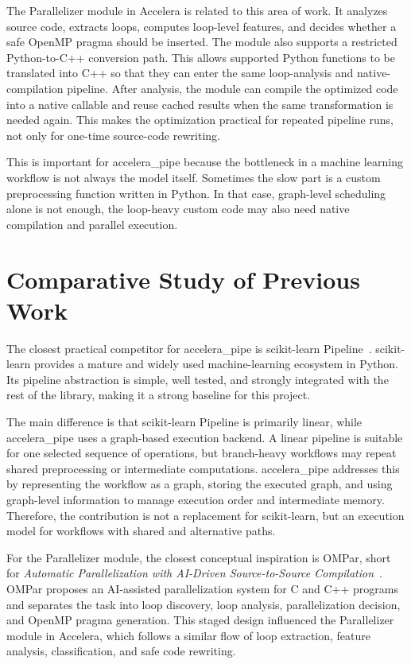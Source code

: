\documentclass[12pt,a4paper,oneside]{report}
\newcommand{\systemname}{Accelera}
\begin{document}
The Parallelizer module in Accelera is related to this area of work. It analyzes source
code, extracts loops, computes loop-level features, and decides whether a safe OpenMP
pragma should be inserted. The module also supports a restricted Python-to-C++
conversion path. This allows supported Python functions to be translated into C++ so
that they can enter the same loop-analysis and native-compilation pipeline. After analysis,
the module can compile the optimized code into a native callable and reuse cached results
when the same transformation is needed again. This makes the optimization practical for
repeated pipeline runs, not only for one-time source-code rewriting.

This is important for accelera\_pipe because the bottleneck in a machine learning
workflow is not always the model itself. Sometimes the slow part is a custom preprocessing
function written in Python. In that case, graph-level scheduling alone is not enough, the
loop-heavy custom code may also need native compilation and parallel execution.

\newpage
\section{Comparative Study of Previous Work}
The closest practical competitor for accelera\_pipe is
scikit-learn Pipeline~\cite{pedregosa2011scikit}. scikit-learn
provides a mature and widely used machine-learning ecosystem in Python. Its
pipeline abstraction is simple, well tested, and strongly integrated with the
rest of the library, making it a strong baseline for this project.

The main difference is that scikit-learn Pipeline is primarily linear,
while accelera\_pipe uses a graph-based execution backend. A linear
pipeline is suitable for one selected sequence of operations, but branch-heavy
workflows may repeat shared preprocessing or intermediate computations.
accelera\_pipe addresses this by representing the workflow as a graph,
storing the executed graph, and using graph-level information to manage execution
order and intermediate memory. Therefore, the contribution is not a replacement
for scikit-learn, but an execution model for workflows with shared and
alternative paths.

For the Parallelizer module, the closest conceptual inspiration is OMPar,
short for \emph{Automatic Parallelization with AI-Driven Source-to-Source
Compilation}~\cite{ompar2024}. OMPar proposes an AI-assisted parallelization
system for C and C++ programs and separates the task into loop discovery, loop
analysis, parallelization decision, and OpenMP pragma generation. This staged
design influenced the Parallelizer module in \systemname{}, which follows a
similar flow of loop extraction, feature analysis, classification, and safe code
rewriting.
\end{document}
